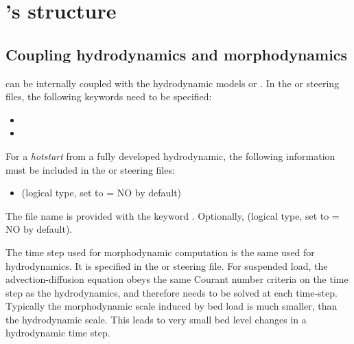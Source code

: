 \pagebreak

\section{\gaia{}'s structure}

\subsection{Coupling hydrodynamics and morphodynamics}
\gaia{} can be internally coupled with the hydrodynamic models  or . In the  or  steering files, the following keywords need to be specified:
\begin{itemize}
\item {}
\item {}
\end{itemize}
For a \textit{hotstart} from a fully developed hydrodynamic, the following information must be included in the  or  steering files:
\begin{itemize}
\item {} (logical type, set to {\ttfamily = NO} by default)
\end{itemize}
The file name is provided with the keyword . Optionally,  (logical type, set to {\ttfamily = NO} by default).

The time step used for morphodynamic computation is the same used for hydrodynamics. It is specified in the  or  steering file. For suspended load, the advection-diffusion equation obeys the same Courant number criteria on the time step as the hydrodynamics, and therefore needs to be solved at each time-step. Typically the morphodynamic scale induced by bed load is much smaller, than the hydrodynamic scale. This leads to very small bed level changes in a hydrodynamic time step.

